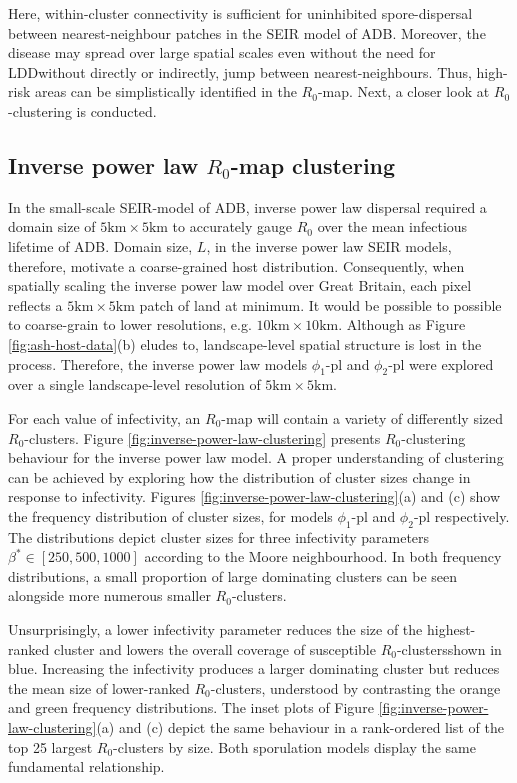 Here, within-cluster connectivity is sufficient for uninhibited spore-dispersal between nearest-neighbour patches in the SEIR model of ADB.
Moreover, the disease may spread over large spatial scales even without the need for LDD\textemdash without directly or indirectly, jump between nearest-neighbours.
Thus, high-risk areas can be simplistically identified in the $R_0$-map.
Next, a closer look at $R_0$-clustering is conducted.

\subsection{Inverse power law $R_0$-map clustering}
\label{sec:inverse-power-law-r0-clustering}

In the small-scale SEIR-model of ADB, inverse power law dispersal required a domain size of $\mathrm{5km \times 5km}$ to accurately gauge $R_0$ over the mean infectious lifetime of ADB.
Domain size, $L$, in the inverse power law SEIR models, therefore, motivate a coarse-grained host distribution.
Consequently, when spatially scaling the inverse power law model over Great Britain, each pixel reflects a $\mathrm{5km \times 5km}$ patch of land at minimum.
It would be possible to possible to coarse-grain to lower resolutions, e.g. $\mathrm{10km \times 10km}$.
Although as Figure \ref{fig:ash-host-data}(b) eludes to, landscape-level spatial structure is lost in the process.
Therefore, the inverse power law models $\phi_1$-pl and $\phi_2$-pl were explored over a single landscape-level resolution of $\mathrm{5km \times 5km}$.

For each value of infectivity, an $R_0$-map will contain a variety of differently sized $R_0$-clusters.
Figure \ref{fig:inverse-power-law-clustering} presents $R_0$-clustering behaviour for the inverse power law model.
A proper understanding of clustering can be achieved by exploring how the distribution of cluster sizes change in response to infectivity. 
Figures \ref{fig:inverse-power-law-clustering}(a) and (c) show the frequency distribution of cluster sizes, 
for models $\phi_1$-pl and $\phi_2$-pl respectively.
The distributions depict cluster sizes for three infectivity parameters $\beta^* \in [250, 500, 1000]$ according to the Moore neighbourhood.
In both frequency distributions, a small proportion of large dominating clusters can be seen alongside more numerous smaller $R_0$-clusters.

Unsurprisingly, a lower infectivity parameter reduces the size of the highest-ranked cluster and lowers the overall coverage of susceptible $R_0$-clusters\textemdash shown in blue.
Increasing the infectivity produces a larger dominating cluster but reduces the mean size of lower-ranked $R_0$-clusters, 
understood by contrasting the orange and green frequency distributions.
The inset plots of Figure \ref{fig:inverse-power-law-clustering}(a) and (c) depict the same behaviour in a rank-ordered list of the top 25 largest $R_0$-clusters by size.
Both sporulation models display the same fundamental relationship.

